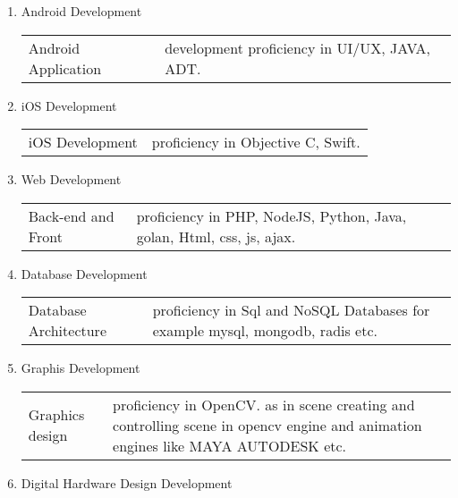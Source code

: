 \documentclass[letterpaper,11pt]{article}
\begin{document}
\begin{enumerate}
\item Android Development\\
 \begin{center}
	\begin{tabular}{p{5cm} p{11cm} }
	 Android Application & development proficiency in UI/UX, JAVA, ADT.\\
	\end{tabular}
 \end{center}
\item iOS Development\\
 \begin{center}
	\begin{tabular}{p{5cm} p{11cm} }
		iOS Development & proficiency in Objective C, Swift.\\
	\end{tabular}
 \end{center}
\item Web Development\\
 \begin{center}
	\begin{tabular}{p{5cm} p{11cm} }
		Back-end and Front & proficiency in PHP, NodeJS, Python, Java, golan, Html, css, js, ajax.\\
	\end{tabular}
 \end{center}
\item Database Development\\
 \begin{center}
	\begin{tabular}{p{5cm} p{11cm} }
		Database Architecture & proficiency in Sql and NoSQL Databases for example mysql, mongodb, radis etc.\\
	\end{tabular}
 \end{center}
\item Graphis Development\\
 \begin{center}
	\begin{tabular}{p{5cm} p{11cm} }
		Graphics design & proficiency in OpenCV. as in scene creating and controlling scene in opencv engine and animation engines like MAYA AUTODESK etc.\\
	\end{tabular}
 \end{center}
\item Digital Hardware Design Development\\
 \begin{center}

\end{center}
\end{enumerate}
\end{document}
